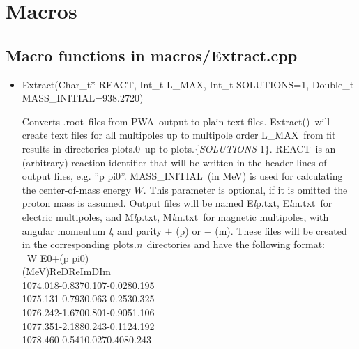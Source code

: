 \documentclass[a4paper,10pt]{article}
\def\PWA{\ttfamily PWA\rmfamily\ }
\def\bl{\phantom{0}}
\def\tt{\ttfamily}
\def\rm{\rmfamily}
\begin{document}
\section{Macros}

\subsection{Macro functions in  \tt macros/Extract.cpp\rm}

\begin{itemize}
\item
\tt Extract(Char\_t* REACT, Int\_t L\_MAX, Int\_t SOLUTIONS=1, Double\_t MASS\_INITIAL=938.2720)\rm

Converts \tt .root\rm\ files from \PWA output to plain text files. \tt Extract()\rm\ will
create text files for all multipoles up to multipole order \tt L\_MAX\rm\ from fit results in directories
\tt plots.0\rm\ up to \tt plots.$\lbrace$\textit{SOLUTIONS}-1$\rbrace$\rm.
\tt REACT\rm\ is an (arbitrary) reaction identifier that will be written in the header lines of output files,
e.g. \tt ''p pi0''\rm. \tt MASS\_INITIAL\rm\ (in MeV) is used for calculating the center-of-mass energy $W$. This parameter 
is optional, if it is omitted the proton mass is assumed.
Output files will be named
\tt E\textit{l}p.txt\rm,
\tt E\textit{l}m.txt\rm\ 
for electric multipoles, and
\tt M\textit{l}p.txt\rm,
\tt M\textit{l}m.txt\rm\ 
for magnetic multipoles, with angular momentum \tt\textit{l}\rm, and parity
$+$ (\tt p\rm) or $-$ (\tt m\rm). These files
will be created in the corresponding 
\tt plots.\textit{n}\rm\ directories and have the following format:\\

\tt
$\bl$\bl\bl W \bl\bl\bl\bl\bl\bl\bl\bl\bl\bl\bl\bl\bl\bl\bl E0+(p pi0)\\
\bl(MeV)\bl\bl\bl\bl\bl\bl Re\bl\bl\bl\bl\bl\bl DRe\bl\bl\bl\bl\bl\bl Im\bl\bl\bl\bl\bl\bl DIm\\
1074.018\bl\bl\bl -0.837\bl\bl\bl 0.107\bl\bl\bl-0.028\bl\bl\bl 0.195\\
1075.131\bl\bl\bl -0.793\bl\bl\bl 0.063\bl\bl\bl-0.253\bl\bl\bl 0.325\\
1076.242\bl\bl\bl -1.670\bl\bl\bl 0.801\bl\bl\bl-0.905\bl\bl\bl 1.106\\
1077.351\bl\bl\bl -2.188\bl\bl\bl 0.243\bl\bl\bl-0.112\bl\bl\bl 4.192\\
1078.460\bl\bl\bl -0.541\bl\bl\bl 0.027\bl\bl\bl\bl 0.408\bl\bl\bl 0.243\\
\rm


\end{itemize}
\end{document}
